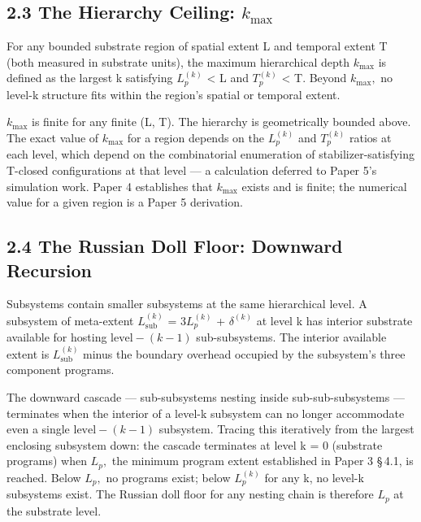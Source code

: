 \documentclass[11pt,oneside]{report}
\theoremstyle{definition}
\theoremstyle{remark}
\begin{document}
\subsection*{2.3 The Hierarchy Ceiling: \ensuremath{k_{\mathrm{max}}}}

For any bounded substrate region of spatial extent L and temporal extent
T (both measured in substrate units), the maximum hierarchical depth
\ensuremath{k_{\mathrm{max}}} is defined as the largest k satisfying \ensuremath{L_{p}^{(k)}} \textless{} L
and \ensuremath{T_{p}^{(k)}} \textless{} T. Beyond \ensuremath{k_{\mathrm{max}},} no level-k structure fits
within the region's spatial or temporal extent.

\ensuremath{k_{\mathrm{max}}} is finite for any finite (L, T). The hierarchy is geometrically
bounded above. The exact value of \ensuremath{k_{\mathrm{max}}} for a region depends on the
\ensuremath{L_{p}^{(k)}} and \ensuremath{T_{p}^{(k)}} ratios at each level, which depend on the
combinatorial enumeration of stabilizer-satisfying T-closed
configurations at that level --- a calculation deferred to Paper 5's
simulation work. Paper 4 establishes that \ensuremath{k_{\mathrm{max}}} exists and is finite;
the numerical value for a given region is a Paper 5 derivation.

\subsection*{2.4 The Russian Doll Floor: Downward Recursion}

Subsystems contain smaller subsystems at the same hierarchical level. A
subsystem of meta-extent \ensuremath{L_{\mathrm{sub}}^{(k)}} = \ensuremath{3L_{p}^{(k)}} + \ensuremath{\delta ^{(k)}} at
level k has interior substrate available for hosting \ensuremath{\text{level}-(k-1)}
sub-subsystems. The interior available extent is \ensuremath{L_{\mathrm{sub}}^{(k)}} minus the
boundary overhead occupied by the subsystem's three component programs.

The downward cascade --- sub-subsystems nesting inside
sub-sub-subsystems --- terminates when the interior of a level-k
subsystem can no longer accommodate even a single \ensuremath{\text{level}-(k-1)} subsystem.
Tracing this iteratively from the largest enclosing subsystem down: the
cascade terminates at level k = 0 (substrate programs) when \ensuremath{L_{p},} the
minimum program extent established in Paper 3 \S\,4.1, is reached. Below
\ensuremath{L_{p},} no programs exist; below \ensuremath{L_{p}^{(k)}} for any k, no level-k
subsystems exist. The Russian doll floor for any nesting chain is
therefore \ensuremath{L_{p}} at the substrate level.
\end{document}
